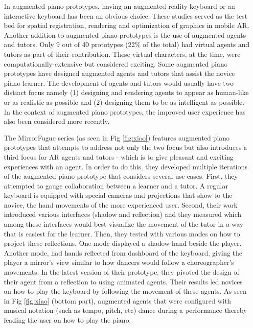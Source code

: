 \documentclass[sigconf, screen, review]{acmart}
\begin{document}
In augmented piano prototypes, having an augmented reality keyboard or an interactive keyboard has been an obvious choice. These studies served as the test bed for spatial registration, rendering and optimization of graphics in mobile AR. Another addition to augmented piano prototypes is the use of augmented agents and tutors. Only 9 out of 40 prototypes (22\% of the total) had virtual agents and tutors as part of their contribution. These virtual characters, at the time, were computationally-extensive but considered exciting. Some augmented piano prototypes have designed augmented agents and tutors that assist the novice piano learner. The development of agents and tutors would usually have two distinct focus namely (1) designing and rendering agents to appear as human-like or as realistic as possible and (2) designing them to be as intelligent as possible. In the context of augmented piano prototypes, the improved user experience has also been considered more recently. 

The MirrorFugue series \cite{xiao2010mirrorfugue, xiao2011duet, xiao2013mirrorfugue, xiao2014andante} (as seen in Fig \ref{fig:xiao}) features augmented piano prototypes that attempts to address not only the two focus but also introduces a third focus for AR agents and tutors - which is to give pleasant and exciting experiences with an agent. In order to do this, they developed multiple iterations of the augmented piano prototype that considers several use-cases. First, they attempted to gauge collaboration between a learner and a tutor. A regular keyboard is equipped with special cameras and projections that show to the novice, the hand movements of the more experienced user. Second, their work introduced various interfaces (shadow and reflection) and they measured which among these interfaces would best visualize the movement of the tutor in a way that is easiest for the learner. Then, they tested with various modes on how to project these reflections. One mode displayed a shadow hand beside the player. Another mode, had hands reflected from dashboard of the keyboard, giving the player a mirror's view similar to how dancers would follow a choreographer's movements. In the latest version of their prototype, they pivoted the design of their agent from a reflection to using animated agents. Their results led novices on how to play the keyboard by following the movement of these agents. As seen in Fig \ref{fig:xiao} (bottom part), augmented agents that were configured with musical notation (such as tempo, pitch, etc) dance during a performance thereby leading the user on how to play the piano. 
\end{document}
